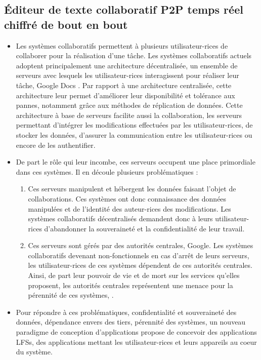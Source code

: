 \subsection{Éditeur de texte collaboratif \ac{P2P} temps réel chiffré de bout en bout}
\label{sec:research-questions-mute}
\begin{itemize}
    \item Les systèmes collaboratifs permettent à plusieurs utilisateur-rices de collaborer pour la réalisation d'une tâche.
        Les systèmes collaboratifs actuels adoptent principalement une architecture décentralisée, \ie un ensemble de serveurs avec lesquels les utilisateur-rices interagissent pour réaliser leur tâche, \eg Google Docs \cite{gdocs}.
        Par rapport à une architecture centralisée, cette architecture leur permet d'améliorer leur disponibilité et tolérance aux pannes, notamment grâce aux méthodes de réplication de données.
        Cette architecture à base de serveurs facilite aussi la collaboration, les serveurs permettant d'intégrer les modifications effectuées par les utilisateur-rices, de stocker les données, d'assurer la communication entre les utilisateur-rices ou encore de les authentifier.
    \item De part le rôle qui leur incombe, ces serveurs occupent une place primordiale dans ces systèmes.
        Il en découle plusieurs problématiques :
        \begin{enumerate}
            \item Ces serveurs manipulent et hébergent les données faisant l'objet de collaborations.
                Ces systèmes ont donc connaissance des données manipulées et de l'identité des auteur-rices des modifications.
                Les systèmes collaboratifs décentralisés demandent donc à leurs utilisateur-rices d'abandonner la souveraineté et la confidentialité de leur travail.
            \item Ces serveurs sont gérés par des autorités centrales, \eg Google.
                Les systèmes collaboratifs devenant non-fonctionnels en cas d'arrêt de leurs serveurs, les utilisateur-rices de ces systèmes dépendent de ces autorités centrales.
                Ainsi, de part leur pouvoir de vie et de mort sur les services qu'elles proposent, les autorités centrales représentent une menace pour la pérennité de ces systèmes, \eg \cite{2022-killed-by-google}.
        \end{enumerate}
    \item Pour répondre à ces problématiques, \ie confidentialité et souveraineté des données, dépendance envers des tiers, pérennité des systèmes, un nouveau paradigme de conception d'applications propose de concevoir des applications \acp{LFS}, \ie des applications mettant les utilisateur-rices et leurs appareils au coeur du système.

\end{itemize}
